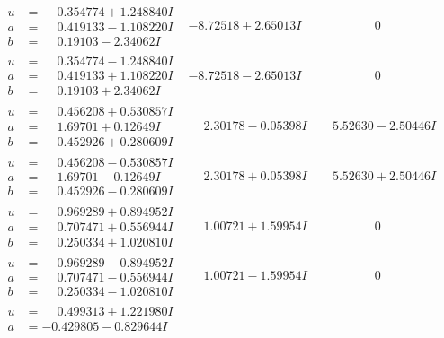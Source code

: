 \documentclass[1p]{elsarticle_modified}
\theoremstyle{definition}
\begin{document}
$$\begin{array}{c|c|c}
\begin{aligned}
u &= \phantom{-}0.354774 + 1.248840 I \\
a &= \phantom{-}0.419133 - 1.108220 I \\
b &= \phantom{-}0.19103 - 2.34062 I\end{aligned}
 & -8.72518 + 2.65013 I & \phantom{-0.000000 } 0 \\ \hline\begin{aligned}
u &= \phantom{-}0.354774 - 1.248840 I \\
a &= \phantom{-}0.419133 + 1.108220 I \\
b &= \phantom{-}0.19103 + 2.34062 I\end{aligned}
 & -8.72518 - 2.65013 I & \phantom{-0.000000 } 0 \\ \hline\begin{aligned}
u &= \phantom{-}0.456208 + 0.530857 I \\
a &= \phantom{-}1.69701 + 0.12649 I \\
b &= \phantom{-}0.452926 + 0.280609 I\end{aligned}
 & \phantom{-}2.30178 - 0.05398 I & \phantom{-}5.52630 - 2.50446 I \\ \hline\begin{aligned}
u &= \phantom{-}0.456208 - 0.530857 I \\
a &= \phantom{-}1.69701 - 0.12649 I \\
b &= \phantom{-}0.452926 - 0.280609 I\end{aligned}
 & \phantom{-}2.30178 + 0.05398 I & \phantom{-}5.52630 + 2.50446 I \\ \hline\begin{aligned}
u &= \phantom{-}0.969289 + 0.894952 I \\
a &= \phantom{-}0.707471 + 0.556944 I \\
b &= \phantom{-}0.250334 + 1.020810 I\end{aligned}
 & \phantom{-}1.00721 + 1.59954 I & \phantom{-0.000000 } 0 \\ \hline\begin{aligned}
u &= \phantom{-}0.969289 - 0.894952 I \\
a &= \phantom{-}0.707471 - 0.556944 I \\
b &= \phantom{-}0.250334 - 1.020810 I\end{aligned}
 & \phantom{-}1.00721 - 1.59954 I & \phantom{-0.000000 } 0 \\ \hline\begin{aligned}
u &= \phantom{-}0.499313 + 1.221980 I \\
a &= -0.429805 - 0.829644 I \\

\end{aligned}
\end{array}$$
\end{document}
